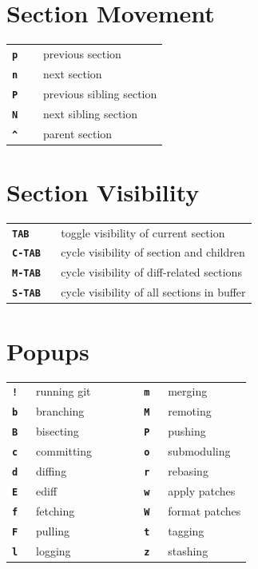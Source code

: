 \documentclass[9pt]{extarticle} %
\begin{document}
\begin{multicols}{3}
  \renewcommand{\arraystretch}{1.1}
  \section*{Section Movement}
  \begin{tabular}{L{0.20\linewidth} L{0.80\linewidth}}
    \tt \textbf{p}  & previous section \\
    \tt \textbf{n}  & next section \\
    \tt \textbf{P}  & previous sibling section \\
    \tt \textbf{N}  & next sibling section \\
    \tt \textbf{\^{}} & parent section
  \end{tabular}


  \section*{Section Visibility}

  \begin{tabular}{L{0.20\linewidth} L{0.80\linewidth}}
    \tt \textbf{TAB} & toggle visibility of current section \\
    \tt \textbf{C-TAB} & cycle visibility of section and children \\
    \tt \textbf{M-TAB} & cycle visibility of diff-related sections \\
    \tt \textbf{S-TAB} & cycle visibility of all sections in buffer
  \end{tabular}

  \columnbreak{}

  \section*{Popups}

  \begin{tabular}{L{0.1\linewidth} L{0.3\linewidth} C{0.15\linewidth}
    L{0.1\linewidth} L{0.35\linewidth}}
    \tt \textbf{!} & running git & & \tt \textbf{m} & merging \\
    \tt \textbf{b} & branching & & \tt \textbf{M} & remoting \\
    \tt \textbf{B} & bisecting & & \tt \textbf{P} & pushing \\
    \tt \textbf{c} & committing & & \tt \textbf{o} & submoduling \\
    \tt \textbf{d} & diffing & & \tt \textbf{r} & rebasing \\
    \tt \textbf{E} & ediff & & \tt \textbf{w} & apply patches \\
    \tt \textbf{f} & fetching & & \tt \textbf{W} & format patches \\
    \tt \textbf{F} & pulling & & \tt \textbf{t} & tagging \\
    \tt \textbf{l} & logging & & \tt \textbf{z} & stashing
  \end{tabular}


\end{multicols}
\end{document}
